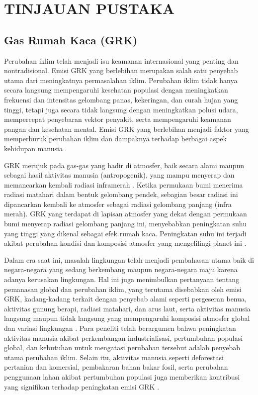 \chapter{TINJAUAN PUSTAKA}
\label{BAB2:tinjauan}

\section{Gas Rumah Kaca (GRK)}
Perubahan iklim telah menjadi isu keamanan internasional yang penting dan nontradisional. Emisi GRK yang berlebihan merupakan salah satu penyebab utama dari meningkatnya permasalahan iklim. Perubahan iklim tidak hanya secara langsung mempengaruhi kesehatan populasi dengan meningkatkan frekuensi dan intensitas gelombang panas, kekeringan, dan curah hujan yang tinggi, tetapi juga secara tidak langsung dengan meningkatkan polusi udara, mempercepat penyebaran vektor penyakit, serta mempengaruhi keamanan pangan dan kesehatan mental. Emisi GRK yang berlebihan menjadi faktor yang memperburuk perubahan iklim dan dampaknya terhadap berbagai aspek kehidupan manusia \cite{wang_impact_2022}.

GRK merujuk pada gas-gas yang hadir di atmosfer, baik secara alami maupun sebagai hasil aktivitas manusia (antropogenik), yang mampu menyerap dan memancarkan kembali radiasi inframerah \cite{purnamasari_inventarisasi_2019}. Ketika permukaan bumi menerima radiasi matahari dalam bentuk gelombang pendek, sebagian besar radiasi ini dipancarkan kembali ke atmosfer sebagai radiasi gelombang panjang (infra merah). GRK yang terdapat di lapisan atmosfer yang dekat dengan permukaan bumi menyerap radiasi gelombang panjang ini, menyebabkan peningkatan suhu yang tinggi yang dikenal sebagai efek rumah kaca. Peningkatan suhu ini terjadi akibat perubahan kondisi dan komposisi atmosfer yang mengelilingi planet ini \cite{pratama_efek_2019}.

Dalam era saat ini, masalah lingkungan telah menjadi pembahasan utama baik di negara-negara yang sedang berkembang maupun negara-negara maju karena adanya kerusakan lingkungan. Hal ini juga menimbulkan pertanyaan tentang pemanasan global dan perubahan iklim, yang terutama disebabkan oleh emisi GRK, kadang-kadang terkait dengan penyebab alami seperti pergeseran benua, aktivitas gunung berapi, radiasi matahari, dan arus laut, serta aktivitas manusia langsung maupun tidak langsung yang mempengaruhi komposisi atmosfer global dan variasi lingkungan \cite{li_relationship_2023}. Para peneliti telah berargumen bahwa peningkatan aktivitas manusia akibat perkembangan industrialisasi, pertumbuhan populasi global, dan kebutuhan untuk mengatasi perubahan tersebut adalah penyebab utama perubahan iklim. Selain itu, aktivitas manusia seperti deforestasi pertanian dan komersial, pembakaran bahan bakar fosil, serta perubahan penggunaan lahan akibat pertumbuhan populasi juga memberikan kontribusi yang signifikan terhadap peningkatan emisi GRK \cite{yoro_co2_2020}.

